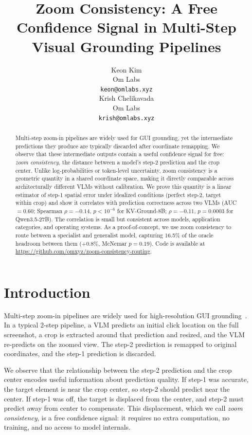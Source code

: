 \documentclass{article}
\title{Zoom Consistency: A Free Confidence Signal in Multi-Step Visual Grounding Pipelines}
\author{
  Keon Kim \\
  Om Labs \\
  \texttt{keon@omlabs.xyz} \\
  \And
  Krish Chelikavada \\
  Om Labs \\
  \texttt{krish@omlabs.xyz} \\
}
\begin{document}
\maketitle

\begin{abstract}
Multi-step zoom-in pipelines are widely used for GUI grounding, yet the intermediate predictions they produce are typically discarded after coordinate remapping. We observe that these intermediate outputs contain a useful confidence signal for free: \emph{zoom consistency}, the distance between a model's step-2 prediction and the crop center. Unlike log-probabilities or token-level uncertainty, zoom consistency is a geometric quantity in a shared coordinate space, making it directly comparable across architecturally different VLMs without calibration. We prove this quantity is a linear estimator of step-1 spatial error under idealized conditions (perfect step-2, target within crop) and show it correlates with prediction correctness across two VLMs (AUC $= 0.60$; Spearman $\rho = -0.14$, $p < 10^{-6}$ for KV-Ground-8B; $\rho = -0.11$, $p = 0.0003$ for Qwen3.5-27B). The correlation is small but consistent across models, application categories, and operating systems. As a proof-of-concept, we use zoom consistency to route between a specialist and generalist model, capturing 16.5\% of the oracle headroom between them (+0.8\%, McNemar $p = 0.19$). Code is available at \url{https://github.com/omxyz/zoom-consistency-routing}.
\end{abstract}

\section{Introduction}

Multi-step zoom-in pipelines are widely used for high-resolution GUI grounding~\cite{zoomclick,laser,adazoomgui}. In a typical 2-step pipeline, a VLM predicts an initial click location on the full screenshot, a crop is extracted around that prediction and resized, and the VLM re-predicts on the zoomed view. The step-2 prediction is remapped to original coordinates, and the step-1 prediction is discarded.

We observe that the relationship between the step-2 prediction and the crop center encodes useful information about prediction quality. If step-1 was accurate, the target element is near the crop center, so step-2 should predict near the center. If step-1 was off, the target is displaced from the center, and step-2 must predict away from center to compensate. This displacement, which we call \emph{zoom consistency}, is a free confidence signal: it requires no extra computation, no training, and no access to model internals.
\end{document}
